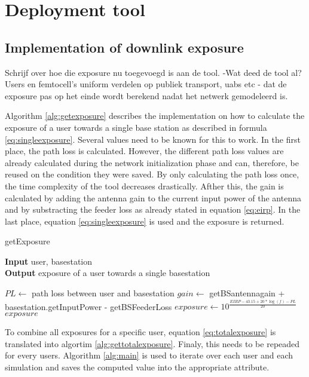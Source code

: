 \chapter{Deployment tool}
\label{chap:deploymenttool}

\section{Implementation of downlink exposure}
\label{sec:downlinkimplementation}

Schrijf over hoe die exposure nu toegevoegd is aan de tool. 
-Wat deed de tool al? Users en femtocell's uniform verdelen op publiek transport, uabs etc
- dat de exposure pas op het einde wordt berekend nadat het netwerk gemodeleerd is.

Algorithm \ref{alg:getexposure} describes the implementation on how to calculate the exposure of a user towards a single base station as described in formula \ref{eq:singleexposure}.
Several values need to be known for this to work. In the first place, the path loss is calculated.  However, the different path loss values are already calculated during the network initialization phase and can, therefore, be reused on the condition they were saved. By only calculating the path loss once,  the time complexity of the tool decreases drastically. 
Afther this, the gain is calculated by adding the antenna gain to the  current input power of the antenna and by substracting the feeder loss as already stated in equation \ref{eq:eirp}.
In the last place, equation \ref{eq:singleexposure} is used and the exposure is returned.

\begin{algorithm}
	\caption{getExposure} 
	\label{alg:getexposure}
     \hspace*{\algorithmicindent} \textbf{Input} user, basestation\\
     \hspace*{\algorithmicindent} \textbf{Output} exposure of a user towards a single basestation
	\begin{algorithmic}[1]
        \State $PL \gets$ path loss between user and basestation
        \State $gain \gets$ getBSantennagain + basestation.getInputPower - getBSFeederLoss
		\State $exposure \gets 10^{\frac{EIRP - 43.15 + 20*\log(f)- PL}{20}}$ \\
    \Return $exposure$ 
	\end{algorithmic} 
\end{algorithm}

To combine all exposures for a specific user, equation \ref{eq:totalexposure} is translated into algortim \ref{alg:gettotalexposure}.
Finaly, this needs to be repeaded for every users. Algorithm \ref{alg:main} is used to iterate over each user and each simulation and saves the computed value
into the appropriate attribute.

